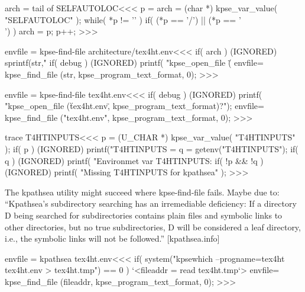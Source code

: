 {{%

\<arch = tail of SELFAUTOLOC\><<<
p = arch = (char *) kpse_var_value( "SELFAUTOLOC" );
while( *p != '\0' ){
   if( (*p ==   '/') || (*p == '\\') ){
      arch = p;
   }
   p++;
}
>>>


\<envfile = kpse-find-file architecture/tex4ht.env\><<<
if( arch ){
  (IGNORED) sprintf(str,"%
  if( debug ){ 
    (IGNORED) printf(
      "kpse_open_file (\"%
  }
  envfile= kpse_find_file (str, kpse_program_text_format, 0);
}
>>>


\<envfile = kpse-find-file tex4ht.env\><<<
if( debug ){ 
  (IGNORED) printf(
    "kpse_open_file (\"tex4ht.env\", kpse_program_text_format)?\n"); 
}
envfile= kpse_find_file ("tex4ht.env", kpse_program_text_format, 0);
>>>








\<trace T4HTINPUTS\><<<
p = (U_CHAR *) kpse_var_value( "T4HTINPUTS" );
if( p ){
   (IGNORED) printf("T4HTINPUTS = %
}
q = getenv("T4HTINPUTS");
if( q ){  (IGNORED) printf(
   "Environmet var T4HTINPUTS:  %
}
if( !p && !q ){
   (IGNORED) printf( "Missing T4HTINPUTS for kpathsea\n" );
}
>>>








The kpathsea utility might succeed where kpse-find-file fails.  Maybe due to:
``Kpathsea's subdirectory searching has an
     irremediable deficiency: If a directory D being searched for
     subdirectories contains plain files and symbolic links to other
     directories, but no true subdirectories, D will be considered a
     leaf directory, i.e., the symbolic links will not be followed.'' 
[\Link[http://www.tug.org/svn/texlive/trunk/Build/source/texk/kpathsea/kpathsea.info?view=markup]{}{}kpathsea.info\EndLink]




\<envfile = kpathsea tex4ht.env\><<<
if( system("kpsewhich --progname=tex4ht tex4ht.env > tex4ht.tmp") == 0 ){
   `<fileaddr = read tex4ht.tmp`>
   envfile= kpse_find_file (fileaddr, kpse_program_text_format, 0);
}
>>>



}}
